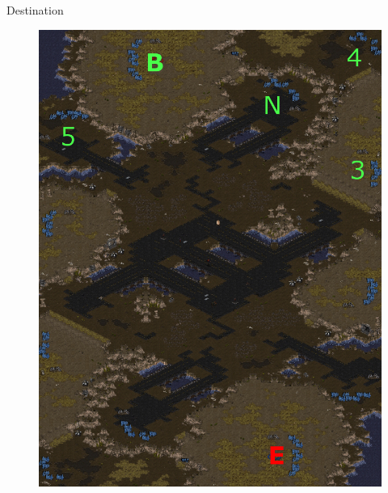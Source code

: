 \documentclass{beamer}
\begin{document}
\begin{frame}{Destination}
  \begin{figure}
  \centering
  \includegraphics[scale=0.2]{Imagens/exp-dest-top.jpg}
  \label{fig:exp-dest}
\end{figure}
\end{frame}
\end{document}
